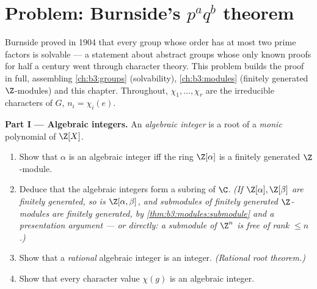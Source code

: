 \section{Problem: Burnside's \texorpdfstring{$p^aq^b$}{paqb}
theorem}

\begin{problem}\label{pb:b3:representations:1}
Burnside proved in 1904 that every group whose order has at most
two prime factors is solvable --- a statement about abstract
groups whose only known proofs for half a century went through
character theory. This problem builds the proof in full,
assembling \cref{ch:b3:groups} (solvability),
\cref{ch:b3:modules} (finitely generated $\Z$-modules) and this
chapter. Throughout, $\chi_1, \dots, \chi_r$ are the irreducible
characters of $G$, $n_i = \chi_i(e)$.

\medskip
\noindent\textbf{Part I --- Algebraic integers.} An
\emph{algebraic integer} is a root of a \emph{monic} polynomial
of $\Z[X]$.
\begin{enumerate}
  \item Show that $\alpha$ is an algebraic integer iff the ring
        $\Z[\alpha]$ is a finitely generated $\Z$-module.
  \item Deduce that the algebraic integers form a subring of
        $\C$. \emph{(If $\Z[\alpha], \Z[\beta]$ are finitely
        generated, so is $\Z[\alpha, \beta]$, and submodules of
        finitely generated $\Z$-modules are finitely generated,
        by \cref{thm:b3:modules:submodule} and a presentation
        argument --- or directly: a submodule of $\Z^n$ is free
        of rank $\leq n$.)}
  \item Show that a \emph{rational} algebraic integer is an
        integer. \emph{(Rational root theorem.)}
  \item Show that every character value $\chi(g)$ is an
        algebraic integer.
\end{enumerate}


\end{problem}
